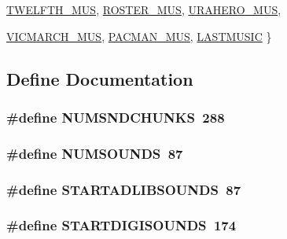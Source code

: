 \begin{DoxyCompactItemize}
\hyperlink{BUDIOWL6_8H_a196fbe29c4c02d90973f0b611ed0958ba2daba453f800e809bfb4fca6124da377}{TWELFTH\_\-MUS}, 
\hyperlink{BUDIOWL6_8H_a196fbe29c4c02d90973f0b611ed0958ba69e9e273ab13839b09e0976829002046}{ROSTER\_\-MUS}, 
\hyperlink{BUDIOWL6_8H_a196fbe29c4c02d90973f0b611ed0958ba7a71704b46eb8baaa32e6f817634328d}{URAHERO\_\-MUS}, 
\par
\hyperlink{BUDIOWL6_8H_a196fbe29c4c02d90973f0b611ed0958ba26a6deb65452e9b3f46d3e8571d2d2f7}{VICMARCH\_\-MUS}, 
\hyperlink{BUDIOWL6_8H_a196fbe29c4c02d90973f0b611ed0958ba69e6ef1a3a2ca4f191c98b37d6a8f0a9}{PACMAN\_\-MUS}, 
\hyperlink{BUDIOWL6_8H_a196fbe29c4c02d90973f0b611ed0958ba4c2fa07a163e141352f7e828f629dd59}{LASTMUSIC}
 \}
\end{DoxyCompactItemize}


\subsection{Define Documentation}
\hypertarget{BUDIOWL6_8H_adb660029e11963733384781d8bd6dc24}{
\subsubsection[{NUMSNDCHUNKS}]{\setlength{\rightskip}{0pt plus 5cm}\#define NUMSNDCHUNKS~288}}
\label{BUDIOWL6_8H_adb660029e11963733384781d8bd6dc24}
\hypertarget{BUDIOWL6_8H_aa948e91a657468d5faa690ec1a89230b}{
\subsubsection[{NUMSOUNDS}]{\setlength{\rightskip}{0pt plus 5cm}\#define NUMSOUNDS~87}}
\label{BUDIOWL6_8H_aa948e91a657468d5faa690ec1a89230b}
\hypertarget{BUDIOWL6_8H_a7d40bf6bf62cde9ae5f212e063328200}{
\subsubsection[{STARTADLIBSOUNDS}]{\setlength{\rightskip}{0pt plus 5cm}\#define STARTADLIBSOUNDS~87}}
\label{BUDIOWL6_8H_a7d40bf6bf62cde9ae5f212e063328200}
\hypertarget{BUDIOWL6_8H_adb5a42984ba81d350a944cc41434a6f7}{
\subsubsection[{STARTDIGISOUNDS}]{\setlength{\rightskip}{0pt plus 5cm}\#define STARTDIGISOUNDS~174}}
